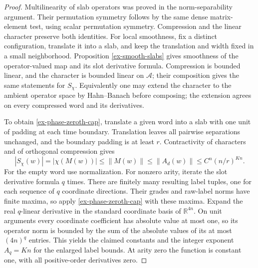 \begin{proof}
Multilinearity of slab operators was proved in the norm-separability
argument. Their permutation symmetry follows by the same dense
matrix-element test, using scalar permutation symmetry. Compression and
the linear character preserve both identities. For local smoothness,
fix a distinct configuration, translate it into a slab, and keep the
translation and width fixed in a small neighborhood. Proposition
\ref{ex-smooth-slabs} gives smoothness of the operator-valued map and
its slot derivative formula. Compression is bounded linear, and the
character is bounded linear on \(\mathcal A\); their composition gives
the same statements for \(S_\chi\). Equivalently one may extend the
character to the ambient operator space by Hahn--Banach before composing;
the extension agrees on every compressed word and its derivatives.

To obtain \eqref{ex-phase-zeroth-cap}, translate a given word into a
slab with one unit of padding at each time boundary. Translation leaves
all pairwise separations unchanged, and the boundary padding is at least
\(r\). Contractivity of characters and of orthogonal compression gives
\[
 |S_\chi(w)|=|\chi(M(w))|\le\|M(w)\|\le\|A_d(w)\|
 \le C^n(n/r)^{Kn}.
\]
For the empty word use normalization. For nonzero arity, iterate the slot
derivative formula \(q\) times. There are finitely many resulting label
tuples, one for each sequence of \(q\) coordinate directions. Their
grades and raw-label norms have finite maxima, so apply
\eqref{ex-phase-zeroth-cap} with these maxima. Expand the real
\(q\)-linear derivative in the standard coordinate basis of
\(\mathbb R^{4n}\). On unit arguments every coordinate coefficient
has absolute value at most one, so its operator norm is bounded by the
sum of the absolute values of its at most \((4n)^q\) entries.
This yields the claimed constants and the integer exponent \(A_q=Kn\)
for the enlarged label bounds. At arity zero the function is constant
one, with all positive-order derivatives zero.
\end{proof}

